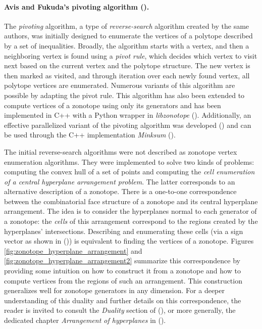 \paragraph*{Avis and Fukuda's pivoting algorithm (\cite{avisPivotingAlgorithmConvex}).}

The \emph{pivoting} algorithm, a type of \emph{reverse-search} algorithm created by the same authors, was initially designed to enumerate the vertices of a polytope described by a set of inequalities. Broadly, the algorithm starts with a vertex, and then a neighboring vertex is found using a \emph{pivot rule}, which decides which vertex to visit next based on the current vertex and the polytope structure. The new vertex is then marked as visited, and through iteration over each newly found vertex, all polytope vertices are enumerated. Numerous variants of this algorithm are possible by adapting the pivot rule. This algorithm has also been extended to compute vertices of a zonotope using only its generators and has been implemented in C++ with a Python wrapper in \emph{libzonotope} (\cite{yngvassonLibzonotope}). Additionally, an effective parallelized variant of the pivoting algorithm was developed (\cite{weibelImplementationParallelizationReverseSearch2010}) and can be used through the C++ implementation \emph{Minksum} (\cite{weibelMinksum}).

The initial reverse-search algorithms were not described as zonotope vertex enumeration algorithms. 
They were implemented to solve two kinds of problems: computing the convex hull of a set of points and computing the \emph{cell enumeration of a central hyperplane arrangement problem}. 
The latter corresponds to an alternative description of a zonotope. There is a one-to-one correspondence between the combinatorial face structure of a zonotope and its central hyperplane arrangement. The idea is to consider the hyperplanes normal to each generator of a zonotope: the \emph{cells} of this arrangement correspond to the regions created by the hyperplanes' intersections. Describing and enumerating these cells (via a sign vector as shown in (\cite{ferrezSolvingFixedRank2005a,radaNewAlgorithmEnumeration2018})) is equivalent to finding the vertices of a zonotope. Figures \ref{fig:zonotope_hyperplane_arrangement} and \ref{fig:zonotope_hyperplane_arrangement2} summarize this correspondence by providing some intuition on how to construct it from a zonotope and how to compute vertices from the regions of such an arrangement. This construction generalizes well for zonotope generators in any dimension. 
For a deeper understanding of this duality and further details on this correspondence, the reader is invited to consult the \emph{Duality} section of (\cite{ferrezSolvingFixedRank2005a}), or more generally, the dedicated chapter \emph{Arrangement of hyperplanes} in (\cite{grunbaumConvexPolytopes2013}).

